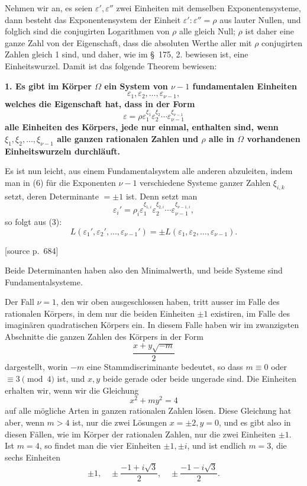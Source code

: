\documentclass[11pt]{article}
\newcommand{\srcpage}[1]{\par\medskip\noindent\textsf{[source p.~#1]}\par\smallskip}
\begin{document}
Nehmen wir an, es seien $\varepsilon',\varepsilon''$ zwei Einheiten mit demselben Exponentensysteme, dann besteht das Exponentensystem der Einheit $\varepsilon':\varepsilon''=\rho$ aus lauter Nullen, und folglich sind die conjugirten Logarithmen von $\rho$ alle gleich Null; $\rho$ ist daher eine ganze Zahl von der Eigenschaft, dass die absoluten Werthe aller mit $\rho$ conjugirten Zahlen gleich 1 sind, und daher, wie im \S~175, 2. bewiesen ist, eine Einheitswurzel. Damit ist das folgende Theorem bewiesen:

\textbf{1. Es gibt im Körper $\Omega$ ein System von $\nu-1$ fundamentalen Einheiten}
\begin{equation}
\varepsilon_1,\varepsilon_2,\ldots,\varepsilon_{\nu-1},
\tag{5}
\end{equation}
\textbf{welches die Eigenschaft hat, dass in der Form}
\begin{equation}
\varepsilon=\rho\varepsilon_1^{\xi_1}\varepsilon_2^{\xi_2}\cdots\varepsilon_{\nu-1}^{\xi_{\nu-1}}
\tag{6}
\end{equation}
\textbf{alle Einheiten des Körpers, jede nur einmal, enthalten sind, wenn $\xi_1,\xi_2,\ldots,\xi_{\nu-1}$ alle ganzen rationalen Zahlen und $\rho$ alle in $\Omega$ vorhandenen Einheitswurzeln durchläuft.}

Es ist nun leicht, aus einem Fundamentalsystem alle anderen abzuleiten, indem man in (6) für die Exponenten $\nu-1$ verschiedene Systeme ganzer Zahlen $\xi_{i,k}$ setzt, deren Determinante $=\pm1$ ist. Denn setzt man
\[
\varepsilon_i'=\rho_i\varepsilon_1^{\xi_{1,i}}\varepsilon_2^{\xi_{2,i}}\cdots\varepsilon_{\nu-1}^{\xi_{\nu-1,i}},
\]
so folgt aus (3):
\[
L(\varepsilon_1',\varepsilon_2',\ldots,\varepsilon_{\nu-1}')=\pm L(\varepsilon_1,\varepsilon_2,\ldots,\varepsilon_{\nu-1}).
\]

\srcpage{684}
Beide Determinanten haben also den Minimalwerth, und beide Systeme sind Fundamentalsysteme.

Der Fall $\nu=1$, den wir oben ausgeschlossen haben, tritt ausser im Falle des rationalen Körpers, in dem nur die beiden Einheiten $\pm1$ existiren, im Falle des imaginären quadratischen Körpers ein. In diesem Falle haben wir im zwanzigsten Abschnitte die ganzen Zahlen des Körpers in der Form
\[
\frac{x+y\sqrt{-m}}{2}
\]
dargestellt, worin $-m$ eine Stammdiscriminante bedeutet, so dass $m\equiv0$ oder $\equiv3\pmod 4$ ist, und $x,y$ beide gerade oder beide ungerade sind. Die Einheiten erhalten wir, wenn wir die Gleichung
\[
x^2+my^2=4
\]
auf alle mögliche Arten in ganzen rationalen Zahlen lösen. Diese Gleichung hat aber, wenn $m>4$ ist, nur die zwei Lösungen $x=\pm2,y=0$, und es gibt also in diesen Fällen, wie im Körper der rationalen Zahlen, nur die zwei Einheiten $\pm1$. Ist $m=4$, so findet man die vier Einheiten $\pm1,\pm i$, und ist endlich $m=3$, die sechs Einheiten
\[
\pm1,
\quad \pm\frac{-1+i\sqrt3}{2},
\quad \pm\frac{-1-i\sqrt3}{2}.
\]
\end{document}
